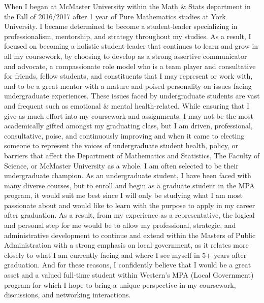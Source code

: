 \documentclass[11pt, a4paper]{awesome-cv}
\begin{document}
\begin{cvletter}
When I began at McMaster University within the Math \& Stats department in the Fall of 2016/2017 after 1 year of Pure Mathematics studies at York University. I became determined to become a student-leader specializing in professionalism, mentorship, and strategy throughout my studies. As a result, I focused on becoming a holistic student-leader that continues to learn and grow in all my coursework, by choosing to develop as a strong assertive communicator and advocate, a compassionate role model who is a team player and consultative for friends, fellow students, and constituents that I may represent or work with,  and to be a great mentor with a mature and poised personality on issues facing undergraduate experiences. These issues faced by undergraduate students are vast and frequent such as emotional \& mental health-related. While ensuring that I give as much effort into my coursework and assignments. I may not be the most academically gifted amongst my graduating class, but I am driven, professional, consultative, poise, and continuously improving and when it came to electing someone to represent the voices of undergraduate student health, policy, or barriers that affect the Department of Mathematics and Statistics, The Faculty of Science, or McMaster University as a whole. I am often selected to be their undergraduate champion. As an undergraduate student, I have been faced with many diverse courses, but to enroll and begin as a graduate student in the MPA program, it would suit me best since I will only be studying what I am most passionate about and would like to learn with the purpose to apply in my career after graduation. As a result, from my experience as a representative, the logical and personal step for me would be to allow my professional, strategic, and administrative development to continue and extend within the Masters of Public Administration with a strong emphasis on local government, as it relates more closely to what I am currently facing and where I see myself in 5+ years after graduation. And for these reasons, I confidently believe that I would be a great asset and a valued full-time student within Western’s MPA (Local Government) program for which I hope to bring a unique perspective in my coursework, discussions, and networking interactions.


\end{cvletter}
\end{document}
